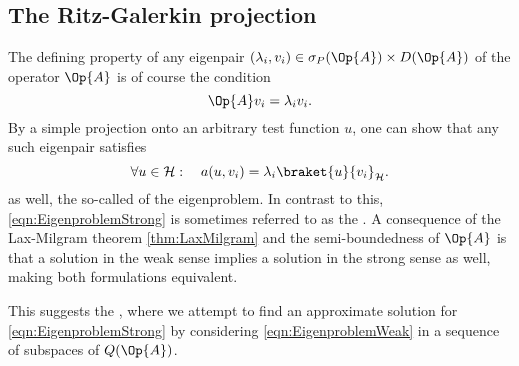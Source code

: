 \subsection{The Ritz-Galerkin projection}
\label{sec:RitzGalerkin}
The defining property of any eigenpair
$(\lambda_i, v_i) \in \sigma_P(\Op{A}) \times D(\Op{A})$
of the operator $\Op{A}$ is of course the condition
\begin{equation}
	\Op{A} v_i = \lambda_i v_i.
	\label{eqn:EigenproblemStrong}
\end{equation}
By a simple projection onto an arbitrary test function $u$,
one can show that any such eigenpair satisfies
\begin{equation}
	\forall u \in \hilbert: \quad a(u, v_i) = \lambda_i \braket{u}{v_i}_\hilbert.
	\label{eqn:EigenproblemWeak}
\end{equation}
as well, the so-called  of the eigenproblem.
In contrast to this, \eqref{eqn:EigenproblemStrong} is sometimes
referred to as the .
A consequence of the Lax-Milgram theorem \vref{thm:LaxMilgram}
and the semi-boundedness of $\Op{A}$
is that a solution in the weak sense implies a solution in the strong sense
as well, making both formulations equivalent.

This suggests the ,
where we attempt to find an approximate solution
for \eqref{eqn:EigenproblemStrong}
by considering \eqref{eqn:EigenproblemWeak}
in a sequence of subspaces of $Q(\Op{A})$.

